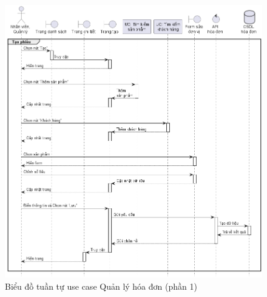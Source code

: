 \documentclass[../DoAn.tex]{subfiles}
\begin{document}
\begin{figure}[H]
    \centering
    \includegraphics[width=1\textwidth]{Hinhve/sequences/InvoiceManage1.png}
    \caption{Biểu đồ tuần tự use case Quản lý hóa đơn (phần 1)}
    \label{figure:sd-invoice-manage1}
\end{figure}
\break
\end{document}
